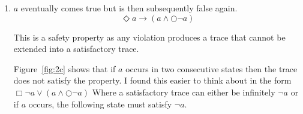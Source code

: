 \documentclass{article}
\begin{document}
\begin{enumerate}
\begin{enumerate}[label=(\alph*)]
                In Figure~\ref{fig:2b} a counterexample example trace is given. If, over an infinite trace, there does not exist a state where $a$ is true: The property is not satisfied by the trace.
                \begin{figure}[htpb]
                    \centering
                    \caption{2 b, counterexample trace}%
                    \label{fig:2b}
                \end{figure}
            \item $a$ eventually comes true but is then subsequently false again.
                \begin{equation}
                    \Diamond a \rightarrow (a \wedge \bigcirc \neg a)
                \end{equation}

                This is a safety property as any violation produces a trace that cannot be extended into a satisfactory trace.

                Figure~\ref{fig:2c} shows that if $a$ occurs in two consecutive states then the trace does not satisfy the property. I found this easier to think about in the form $\Box \neg a \vee (a \wedge \bigcirc\neg a)$ Where a satisfactory trace can either be infinitely $\neg a$ or if $a$ occurs, the following state must satisfy $\neg a$.


\end{enumerate}
\end{enumerate}
\end{document}
